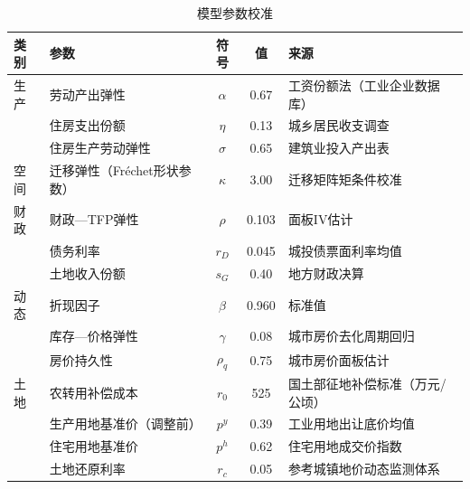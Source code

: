 \documentclass[UTF8,a4paper,12pt]{ctexart}
\theoremstyle{plain}
\theoremstyle{definition}
\theoremstyle{remark}
\begin{document}
\begin{table}[htbp]
  \centering
  \caption{模型参数校准}
  \label{tab:params}
  \begin{tabular}{llccl}
    \toprule
    类别 & 参数 & 符号 & 值 & 来源 \\
    \midrule
    生产 & 劳动产出弹性      & $\alpha$    & 0.67  & 工资份额法（工业企业数据库） \\
         & 住房支出份额      & $\eta$      & 0.13  & 城乡居民收支调查 \\
         & 住房生产劳动弹性  & $\sigma$    & 0.65  & 建筑业投入产出表 \\
    \midrule
    空间 & 迁移弹性（Fréchet形状参数）& $\kappa$    & 3.00  & 迁移矩阵矩条件校准 \\
    \midrule
    财政 & 财政—TFP弹性      & $\rho$      & 0.103 & 面板IV估计 \\
         & 债务利率          & $r_D$       & 0.045 & 城投债票面利率均值 \\
         & 土地收入份额      & $s_G$       & 0.40  & 地方财政决算 \\
    \midrule
    动态 & 折现因子          & $\beta$     & 0.960 & 标准值 \\
         & 库存—价格弹性    & $\gamma$    & 0.08  & 城市房价去化周期回归 \\
         & 房价持久性        & $\rho_q$    & 0.75  & 城市房价面板估计 \\
    \midrule
    土地 & 农转用补偿成本    & $r_0$       & 525   & 国土部征地补偿标准（万元/公顷） \\
         & 生产用地基准价（调整前）& $p^y$  & 0.39  & 工业用地出让底价均值 \\
         & 住宅用地基准价    & $p^h$       & 0.62  & 住宅用地成交价指数 \\
         & 土地还原利率      & $r_c$       & 0.05  & 参考城镇地价动态监测体系 \\
    \bottomrule
  \end{tabular}
\end{table}
\end{document}
